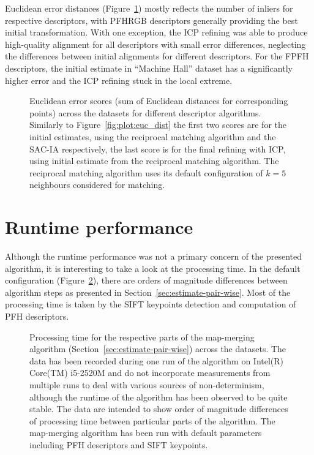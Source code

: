 Euclidean error distances (Figure~\ref{fig:plot:desc_dist}) mostly reflects the number of inliers for respective descriptors, with \gls{PFHRGB} descriptors generally providing the best initial transformation. With one exception, the \gls{ICP} refining was able to produce high-quality alignment for all descriptors with small error differences, neglecting the differences between initial alignments for different descriptors. For the \gls{FPFH} descriptors, the initial estimate in ``Machine Hall'' dataset has a significantly higher error and the \gls{ICP} refining stuck in the local extreme.

\begin{figure}
  \centering
  
  \caption[Euclidean error scores per descriptors]{Euclidean error scores (sum of Euclidean distances for corresponding points) across the datasets for different descriptor algorithms. Similarly to Figure~\ref{fig:plot:euc_dist} the first two scores are for the initial estimates, using the reciprocal matching algorithm and the \gls{SAC-IA} respectively, the last score is for the final refining with \gls{ICP}, using initial estimate from the reciprocal matching algorithm. The reciprocal matching algorithm uses its default configuration of $k=5$ neighbours considered for matching.}
  \label{fig:plot:desc_dist}
\end{figure}

\section{Runtime performance}
\label{sec:runtime-perf}

Although the runtime performance was not a primary concern of the presented algorithm, it is interesting to take a look at the processing time. In the default configuration (Figure~\ref{fig:plot:perf}), there are orders of magnitude differences between algorithm steps as presented in Section~\ref{sec:estimate-pair-wise}. Most of the processing time is taken by the \gls{SIFT} keypoints detection and computation of \gls{PFH} descriptors.

\begin{figure}
  \centering
  
  \caption[Processing time per algorithm parts]{Processing time for the respective parts of the map-merging algorithm (Section~\ref{sec:estimate-pair-wise}) across the datasets. The data has been recorded during one run of the algorithm on Intel(R) Core(TM) i5-2520M and do not incorporate measurements from multiple runs to deal with various sources of non-determinism, although the runtime of the algorithm has been observed to be quite stable. The data are intended to show order of magnitude differences of processing time between particular parts of the algorithm. The map-merging algorithm has been run with default parameters including \gls{PFH} descriptors and \gls{SIFT} keypoints.}
  \label{fig:plot:perf}
\end{figure}


